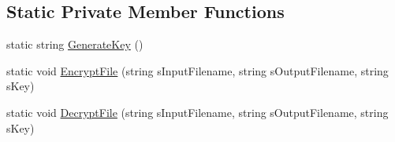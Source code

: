 \subsection*{\-Static \-Private \-Member \-Functions}
\begin{DoxyCompactItemize}
\item 
static string \hyperlink{class_sr_p___classroom_inq_1_1frm_classrrom_inq_a08e314c225eb3c62963d0f268c656163}{\-Generate\-Key} ()
\item 
static void \hyperlink{class_sr_p___classroom_inq_1_1frm_classrrom_inq_a50670d50ceb8042c197d27b2ce179f36}{\-Encrypt\-File} (string s\-Input\-Filename, string s\-Output\-Filename, string s\-Key)
\item 
static void \hyperlink{class_sr_p___classroom_inq_1_1frm_classrrom_inq_a0655d5baf561da80816166c61c6605af}{\-Decrypt\-File} (string s\-Input\-Filename, string s\-Output\-Filename, string s\-Key)
\end{DoxyCompactItemize}
